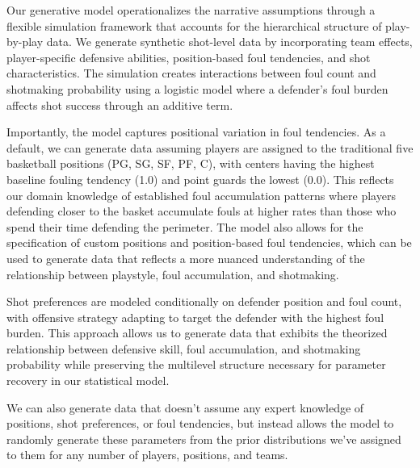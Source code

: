 \documentclass[
  letterpaper,
  DIV=11,
  numbers=noendperiod]{scrartcl}
\begin{document}
Our generative model operationalizes the narrative assumptions through a
flexible simulation framework that accounts for the hierarchical
structure of play-by-play data. We generate synthetic shot-level data by
incorporating team effects, player-specific defensive abilities,
position-based foul tendencies, and shot characteristics. The simulation
creates interactions between foul count and shotmaking probability using
a logistic model where a defender's foul burden affects shot success
through an additive term.

Importantly, the model captures positional variation in foul tendencies.
As a default, we can generate data assuming players are assigned to the
traditional five basketball positions (PG, SG, SF, PF, C), with centers
having the highest baseline fouling tendency (1.0) and point guards the
lowest (0.0). This reflects our domain knowledge of established foul
accumulation patterns where players defending closer to the basket
accumulate fouls at higher rates than those who spend their time
defending the perimeter. The model also allows for the specification of
custom positions and position-based foul tendencies, which can be used
to generate data that reflects a more nuanced understanding of the
relationship between playstyle, foul accumulation, and shotmaking.

Shot preferences are modeled conditionally on defender position and foul
count, with offensive strategy adapting to target the defender with the
highest foul burden. This approach allows us to generate data that
exhibits the theorized relationship between defensive skill, foul
accumulation, and shotmaking probability while preserving the multilevel
structure necessary for parameter recovery in our statistical model.

We can also generate data that doesn't assume any expert knowledge of
positions, shot preferences, or foul tendencies, but instead allows the
model to randomly generate these parameters from the prior distributions
we've assigned to them for any number of players, positions, and teams.
\end{document}
